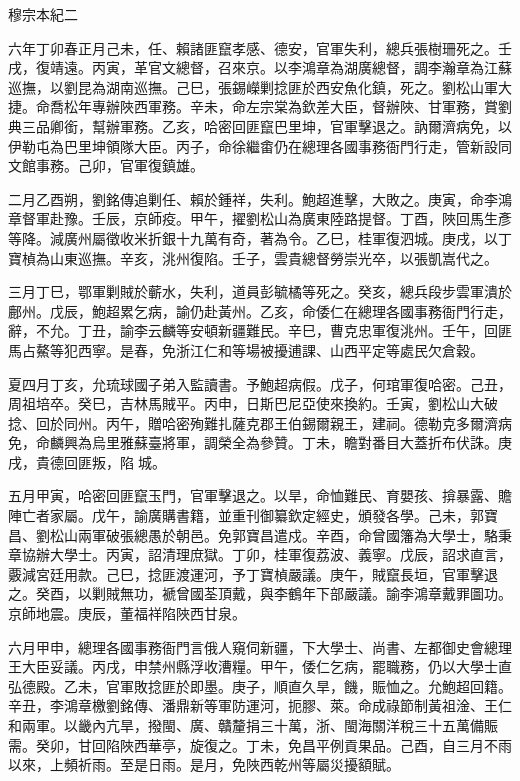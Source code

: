 
\begin{pinyinscope}
穆宗本紀二

六年丁卯春正月己未，任、賴諸匪竄孝感、德安，官軍失利，總兵張樹珊死之。壬戌，復靖遠。丙寅，革官文總督，召來京。以李鴻章為湖廣總督，調李瀚章為江蘇巡撫，以劉昆為湖南巡撫。己巳，張錫嶸剿捻匪於西安魚化鎮，死之。劉松山軍大捷。命喬松年專辦陜西軍務。辛未，命左宗棠為欽差大臣，督辦陜、甘軍務，賞劉典三品卿銜，幫辦軍務。乙亥，哈密回匪竄巴里坤，官軍擊退之。訥爾濟病免，以伊勒屯為巴里坤領隊大臣。丙子，命徐繼畬仍在總理各國事務衙門行走，管新設同文館事務。己卯，官軍復鎮雄。

二月乙酉朔，劉銘傳追剿任、賴於鍾祥，失利。鮑超進擊，大敗之。庚寅，命李鴻章督軍赴豫。壬辰，京師疫。甲午，擢劉松山為廣東陸路提督。丁酉，陜回馬生彥等降。減廣州屬徵收米折銀十九萬有奇，著為令。乙巳，桂軍復泗城。庚戌，以丁寶楨為山東巡撫。辛亥，洮州復陷。壬子，雲貴總督勞崇光卒，以張凱嵩代之。

三月丁巳，鄂軍剿賊於蘄水，失利，道員彭毓橘等死之。癸亥，總兵段步雲軍潰於鄜州。戊辰，鮑超累乞病，諭仍赴黃州。乙亥，命倭仁在總理各國事務衙門行走，辭，不允。丁丑，諭李云麟等安頓新疆難民。辛巳，曹克忠軍復洮州。壬午，回匪馬占鰲等犯西寧。是春，免浙江仁和等場被擾逋課、山西平定等處民欠倉穀。

夏四月丁亥，允琉球國子弟入監讀書。予鮑超病假。戊子，何琯軍復哈密。己丑，周祖培卒。癸巳，吉林馬賊平。丙申，日斯巴尼亞使來換約。壬寅，劉松山大破捻、回於同州。丙午，贈哈密殉難扎薩克郡王伯錫爾親王，建祠。德勒克多爾濟病免，命麟興為烏里雅蘇臺將軍，調榮全為參贊。丁未，瞻對番目大蓋折布伏誅。庚戌，貴德回匪叛，陷城。

五月甲寅，哈密回匪竄玉門，官軍擊退之。以旱，命恤難民、育嬰孩、揜暴露、贍陣亡者家屬。戊午，諭廣購書籍，並重刊御纂欽定經史，頒發各學。己未，郭寶昌、劉松山兩軍破張總愚於朝邑。免郭寶昌遣戍。辛酉，命曾國籓為大學士，駱秉章協辦大學士。丙寅，詔清理庶獄。丁卯，桂軍復荔波、義寧。戊辰，詔求直言，覈減宮廷用款。己巳，捻匪渡運河，予丁寶楨嚴議。庚午，賊竄長垣，官軍擊退之。癸酉，以剿賊無功，褫曾國荃頂戴，與李鶴年下部嚴議。諭李鴻章戴罪圖功。京師地震。庚辰，董福祥陷陜西甘泉。

六月甲申，總理各國事務衙門言俄人窺伺新疆，下大學士、尚書、左都御史會總理王大臣妥議。丙戌，申禁州縣浮收漕糧。甲午，倭仁乞病，罷職務，仍以大學士直弘德殿。乙未，官軍敗捻匪於即墨。庚子，順直久旱，饑，賑恤之。允鮑超回籍。辛丑，李鴻章檄劉銘傳、潘鼎新等軍防運河，扼膠、萊。命成祿節制黃祖淦、王仁和兩軍。以畿內亢旱，撥閩、廣、贛釐捐三十萬，浙、閩海關洋稅三十五萬備賑需。癸卯，甘回陷陜西華亭，旋復之。丁未，免昌平例貢果品。己酉，自三月不雨以來，上頻祈雨。至是日雨。是月，免陜西乾州等屬災擾額賦。


\end{pinyinscope}
